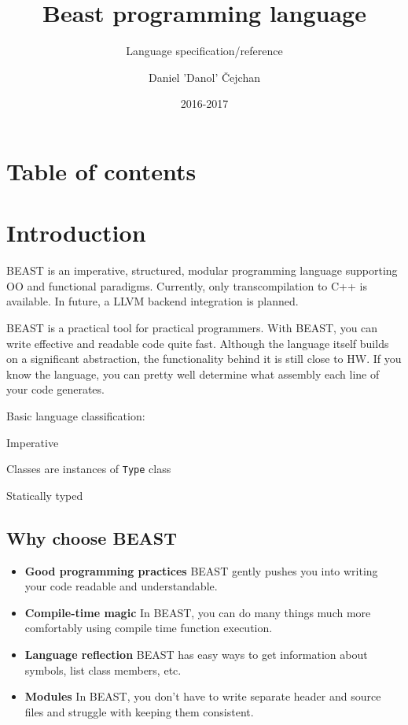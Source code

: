 




\setlength\extrarowheight{2pt}

\title{Beast programming language}
\subtitle{Language specification/reference}
\author{Daniel 'Danol' Čejchan}
\date{2016-2017}



\mainpage

\chapter{Table of contents}
\makeatletter
\setcounter{tocdepth}{1}
\makeatother

\chapter{Introduction}
BEAST is an imperative, structured, modular programming language supporting OO and functional paradigms. Currently, only transcompilation to C++ is available. In future, a LLVM backend integration is planned.

BEAST is a practical tool for practical programmers. With BEAST, you can write effective and readable code quite fast. Although the language itself builds on a significant abstraction, the functionality behind it is still close to HW. If you know the language, you can pretty well determine what assembly each line of your code generates.

Basic language classification:
\begin{compactitem}
	\item Imperative
	\item Classes are instances of \verb|Type| class
	\item Statically typed
\end{compactitem}

\section{Why choose BEAST}
\begin{itemize}
	\item \textbf{Good programming practices} BEAST gently pushes you into writing your code readable and understandable.
	\item \textbf{Compile-time magic} In BEAST, you can do many things much more comfortably using compile time function execution.
	\item \textbf{Language reflection} BEAST has easy ways to get information about symbols, list class members, etc.
	\item \textbf{Modules} In BEAST, you don't have to write separate header and source files and struggle with keeping them consistent.
\end{itemize}

